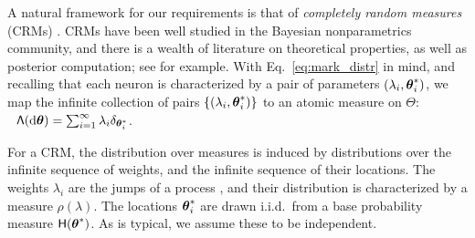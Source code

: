 % 
% 
A natural framework for our requirements is that of \emph{completely random measures} (CRMs) \citep{Kingman:PJM67}.
CRMs have been well studied in the Bayesian nonparametrics community, and there is a wealth of literature on
theoretical properties, as well as posterior computation; see \citep{JamesLP09, Hjo1990, ThiJor2007} for example. 
With Eq.~\eqref{eq:mark_distr} in mind, and recalling that each neuron is characterized by a pair of parameters $(\lambda_i, \boldsymbol{\theta}^*_i)$,
we map the infinite collection of pairs $\{(\lambda_i, \boldsymbol{\theta}^*_i)\}$ to an atomic measure on $\Theta$:
$\ \  \mathsf{\Lambda}(\mathrm{d} \boldsymbol{\theta}) = \sum_{i=1}^{\infty} \lambda_i \delta_{\boldsymbol{\theta}^*_i}$.

For a CRM, the distribution over measures is induced by distributions
over the infinite sequence of weights, and the infinite sequence of their locations. 
The weights $\lambda_i$ are the jumps of a \Levy process \citep{Sato90}, and their distribution is characterized by a 
\Levy measure $\rho(\lambda)$. The locations $\boldsymbol{\theta}^*_i$ are drawn i.i.d.\  from a base probability measure $\mathsf{H}(\boldsymbol{\theta}^*)$.
As is typical, we assume these to be independent. %


